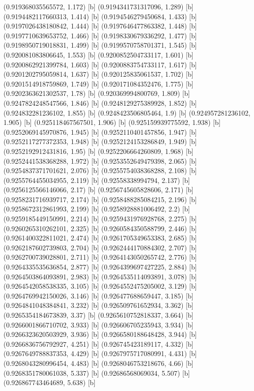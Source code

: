 {{{(0.919368035565572, 1.172) [b] 
(0.9194341731317096, 1.289) [b] 
(0.9194482117660313, 1.414) [b] 
(0.9194546279450684, 1.433) [b] 
(0.9197026438180842, 1.444) [b] 
(0.9197646477863382, 1.448) [b] 
(0.9197710639653752, 1.466) [b] 
(0.9198330679336292, 1.477) [b] 
(0.9198950719018831, 1.499) [b] 
(0.9199570758701371, 1.545) [b] 
(0.920081083806645, 1.553) [b] 
(0.9200852504733117, 1.601) [b] 
(0.9200862921399784, 1.603) [b] 
(0.9200883754733117, 1.617) [b] 
(0.9201202795059814, 1.637) [b] 
(0.920125835061537, 1.702) [b] 
(0.9201514918759869, 1.749) [b] 
(0.920171084352476, 1.775) [b] 
(0.9202363621302537, 1.78) [b] 
(0.920369994800769, 1.809) [b] 
(0.9247824248547566, 1.846) [b] 
(0.9248129275389928, 1.852) [b] 
(0.924832281236102, 1.855) [b] 
(0.9248423506805464, 1.9) [b] 
(0.924957281236102, 1.905) [b] 
(0.925118467567501, 1.906) [b] 
(0.925159939775592, 1.938) [b] 
(0.9252069145970876, 1.945) [b] 
(0.9252110401457856, 1.947) [b] 
(0.9252117277372353, 1.948) [b] 
(0.9252124153286849, 1.949) [b] 
(0.9252192912431816, 1.95) [b] 
(0.9252206664260809, 1.968) [b] 
(0.9252441538368288, 1.972) [b] 
(0.9253552649479398, 2.065) [b] 
(0.9254837371701621, 2.076) [b] 
(0.9255754038368288, 2.108) [b] 
(0.9255764455034955, 2.119) [b] 
(0.92558338994794, 2.137) [b] 
(0.9256125566146066, 2.17) [b] 
(0.9256745605828606, 2.171) [b] 
(0.9258231716939717, 2.174) [b] 
(0.9258488285084215, 2.196) [b] 
(0.9258672312861993, 2.199) [b] 
(0.9258928881006492, 2.2) [b] 
(0.9259185449150991, 2.214) [b] 
(0.9259431976928768, 2.275) [b] 
(0.9260265310262101, 2.325) [b] 
(0.9260584350588799, 2.446) [b] 
(0.9261400322811021, 2.474) [b] 
(0.9261705349653383, 2.685) [b] 
(0.9262187602739803, 2.704) [b] 
(0.9262444170884302, 2.707) [b] 
(0.9262700739028801, 2.711) [b] 
(0.9264143050265742, 2.776) [b] 
(0.9264335535636854, 2.877) [b] 
(0.9264399697427225, 2.884) [b] 
(0.9264503864093891, 2.983) [b] 
(0.9264535114093891, 3.078) [b] 
(0.9264542058538335, 3.105) [b] 
(0.9264552475205002, 3.129) [b] 
(0.9264769942150026, 3.146) [b] 
(0.926477688659447, 3.185) [b] 
(0.9264841048384841, 3.232) [b] 
(0.926509761652934, 3.362) [b] 
(0.9265354184673839, 3.37) [b] 
(0.9265610752818337, 3.664) [b] 
(0.9266001866710702, 3.933) [b] 
(0.926606705235943, 3.934) [b] 
(0.9266323620503929, 3.936) [b] 
(0.9266580188648428, 3.944) [b] 
(0.9266836756792927, 4.251) [b] 
(0.926745423189117, 4.332) [b] 
(0.9267649788837353, 4.429) [b] 
(0.9267975717080991, 4.431) [b] 
(0.9268043280996454, 4.483) [b] 
(0.9268046753218676, 4.66) [b] 
(0.9268351780061038, 5.337) [b] 
(0.92686568069034, 5.507) [b] 
(0.926867743464689, 5.638) [b] 
}}}
